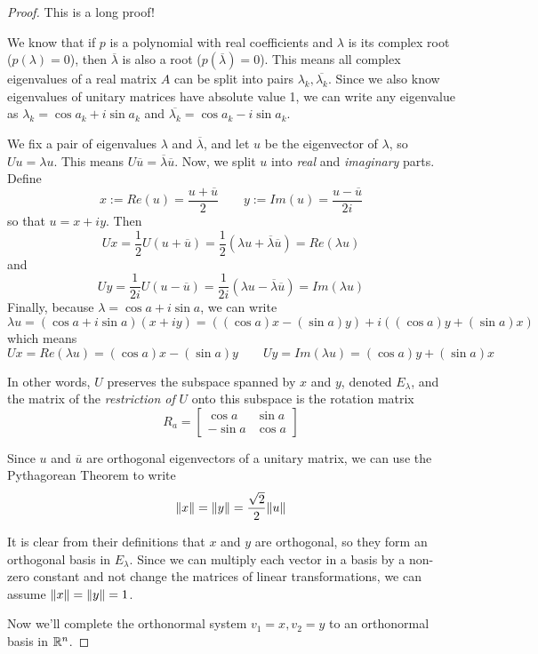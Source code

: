 \begin{proof}
This is a long proof!

We know that if $p$ is a polynomial with real coefficients and $\lambda$ is its complex root ($p(\lambda) = 0$), then $\overline{\lambda}$ is also a root ($p(\overline{\lambda}) = 0$). This means all complex eigenvalues of a real matrix $A$ can be split into pairs $\lambda_{k}, \overline{\lambda_{k}}$. Since we also know eigenvalues of unitary matrices have absolute value 1, we can write any eigenvalue as $\lambda_{k} = \cos a_{k} + i \sin a_{k}$ and $\overline{\lambda_{k}} = \cos a_{k} -i \sin a_{k}$.

We fix a pair of eigenvalues $\lambda$ and $\overline{\lambda}$, and let $u$ be the eigenvector of $\lambda$, so $U u = \lambda u$. This means $U \overline{u} = \overline{\lambda} \overline{u}$. Now, we split $u$ into \textit{real} and \textit{imaginary} parts. Define  
$$x := Re(u) = \frac{u + \overline{u}}{2} \qquad y := Im(u) = \frac{u - \overline{u}}{2i}$$ 
so that $u = x + iy$. Then 
$$Ux = \frac{1}{2} U (u + \overline{u}) = \frac{1}{2} (\lambda u + \overline{\lambda} \overline{u}) = Re(\lambda u)$$ 
and 
$$Uy = \frac{1}{2i} U(u - \overline{u}) = \frac{1}{2i} (\lambda u - \overline{\lambda} \overline{u}) = Im(\lambda u)$$ 
Finally, because $\lambda = \cos a + i \sin a$, we can write 
$$\lambda u = (\cos a + i \sin a)(x + iy) = ((\cos a) x - (\sin a) y) + i((\cos a) y + (\sin a) x)$$
which means 
$$Ux = Re(\lambda u) = (\cos a) x - (\sin a) y \qquad Uy = Im(\lambda u) = (\cos a) y + (\sin a) x$$

In other words, $U$ preserves the subspace spanned by $x$ and $y$, denoted $E_{\lambda}$, and the matrix of the \textit{restriction of} $U$ onto this subspace is the rotation matrix 
$$R_{a} = \begin{bmatrix}
\cos a & \sin a \\
-\sin a & \cos a
\end{bmatrix}$$

Since $u$ and $\overline{u}$ are orthogonal eigenvectors of a unitary matrix, we can use the Pythagorean Theorem to write 
$$\norm{x} = \norm{y} = \frac{\sqrt{2}}{2} \norm{u}$$

It is clear from their definitions that $x$ and $y$ are orthogonal, so they form an orthogonal basis in $E_{\lambda}$. Since we can multiply each vector in a basis by a non-zero constant and not change the matrices of linear transformations, we can assume $\norm{x} = \norm{y} = 1$. 

Now we'll complete the orthonormal system $v_{1} = x, v_{2} = y$ to an orthonormal basis in $\mathbb{R}^{n}$. 


\end{proof}
